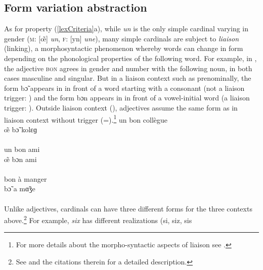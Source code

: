 \documentclass[output=paper]{langsci/langscibook}
\begin{document}
\subsection{\textbf{Form variation abstraction}}\label{formVariation}
\largerpage
As for property (\ref{lexCriteria}a), while \emph{un}  is the only simple cardinal varying in gender (\textsc{m}: [œ̃] %
 \emph{un}, \textsc{f}: [yn] %
 \emph{une}), many simple cardinals  are subject to \emph{liaison} (linking), a morphosyntactic phenomenon whereby  words can change in form depending on the phonological properties of the following word. For example, in , the adjective \textsc{bon} agrees in gender and number with the following noun, in both cases masculine and singular. But in a liaison  context such as prenominally, the form bɔ̃ %
 appears in  in front of a word starting with a consonant (not a liaison  trigger: \lmoins) and the form bɔn %
 appears in  in front of a vowel-initial word (a liaison  trigger: \lplus). Outside liaison  context (\lpause), adjectives assume the same form as in liaison  context without trigger (\lpause=\lmoins{}).\footnote{For more details about the morpho-syntactic aspects of liaison  see \cite{BoBoTse04}.}
\ea\label{simpleLiaison}
	\ea\label{simpleLiaisonA}\gll un bon collègue \\ 	
	œ̃ %
	bɔ̃\lmoins{} %
 kolɛɡ %
 \\ \\
	\ex\label{simpleLiaisonB}\gll un bon ami \\ œ̃ %
 bɔn%
\lplus{} ami %
 \\ \\ 
	\ex\label{noLiaison}\gll bon à manger \\ bɔ̃\lpause{} a %
 mɑ̃ʒe %
 \\ \\ 
	\z
\z
Unlike adjectives, cardinals  can have three different forms for the three contexts above.\footnote{See \cite{Plenat08,Plenat11} and the citations therein for a detailed description.} For example, \emph{six}  has different realizations (si, siz, sis%
\end{document}
